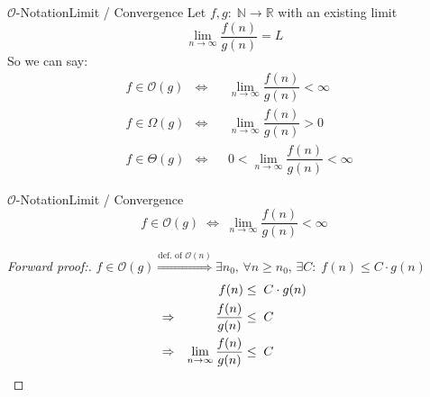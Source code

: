 
\begin{frame}{$\mathcal{O}$-Notation}{Limit / Convergence}
  Let $f,g \! : \; \mathbb{N} \to \mathbb{R}$ with an existing limit
  \[\lim_{n \to \infty} \dfrac{f(n)}{g(n)} = L\]
  So we can say:
  \begin{align}
    & f \in \mathcal{O}(g) & \Leftrightarrow
    && \lim_{n \to \infty} \dfrac{f(n)}{g(n)} < \infty\\
    & f \in \Omega(g) & \Leftrightarrow
    && \lim_{n \to \infty} \dfrac{f(n)}{g(n)} > 0\\
    & f \in \Theta(g) & \Leftrightarrow
    && 0 < \lim_{n \to \infty} \dfrac{f(n)}{g(n)} < \infty
  \end{align}
\end{frame}


\begin{frame}{$\mathcal{O}$-Notation}{Limit / Convergence}
  \[
    f \in \mathcal{O}(g)
    \; \Leftrightarrow \;
    \lim\limits_{n \rightarrow \infty} \frac{f(n)}{g(n)} < \infty
  \]
  \begin{proof}[Forward proof:]
     $f \in \mathcal{O}(g) \stackrel{\text{def. of }\mathcal{O}(n)}{\Rightarrow}
     \exists n_0, \, \forall n \geq n_0, \, \exists C\!:
     \; f(n) \leq C \cdot g(n)$
     \begin{alignat*}{2}
       {} && f(n) &\leq \; C \cdot g(n)\\
       \Rightarrow && \dfrac{f(n)}{g(n)} &\leq \; C\\
       \Rightarrow && \displaystyle
       \lim_{n \to \infty}\dfrac{f(n)}{g(n)} &\leq \; C
       \qedhere
      \end{alignat*}
  \end{proof}
\end{frame}


